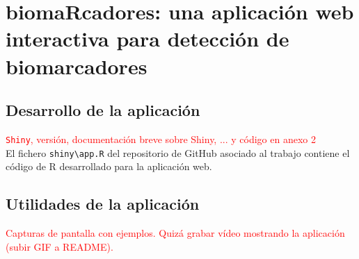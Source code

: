 \chapter{biomaRcadores: una aplicación web interactiva para detección de biomarcadores}

\section{Desarrollo de la aplicación}

\textcolor{red}{\texttt{Shiny}, versión, documentación breve sobre Shiny, ... y código en anexo 2}\\

El fichero \texttt{shiny\textbackslash app.R} del repositorio de GitHub asociado al trabajo \cite{Redondo-Sanchez2020}  contiene el código de R desarrollado para la aplicación web.

\section{Utilidades de la aplicación}

\textcolor{red}{Capturas de pantalla con ejemplos. Quizá grabar vídeo mostrando la aplicación (subir GIF a README).}